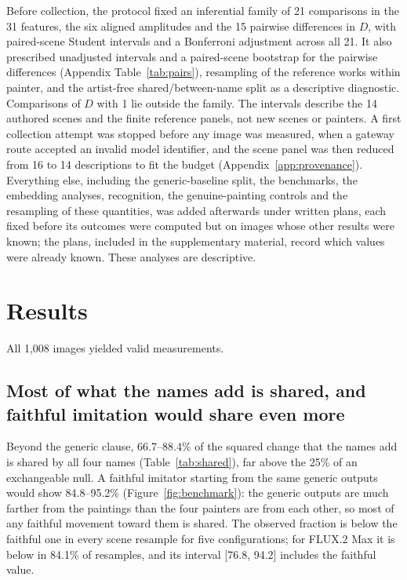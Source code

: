 \documentclass[10pt]{article}
\begin{document}
Before collection, the protocol fixed an inferential family of 21 comparisons in the 31 features,
the six aligned amplitudes and the 15 pairwise differences in $D$, with paired-scene Student
intervals and a Bonferroni adjustment across all 21. It also prescribed unadjusted intervals and a
paired-scene bootstrap for the pairwise differences (Appendix Table~\ref{tab:pairs}), resampling of
the reference works within painter, and the artist-free shared/between-name split as a descriptive
diagnostic. Comparisons of $D$ with 1 lie outside the family. The intervals describe the 14 authored
scenes and the finite reference panels, not new scenes or painters. A first collection attempt was
stopped before any image was measured, when a gateway route accepted an invalid model identifier,
and the scene panel was then reduced from 16 to 14 descriptions to fit the budget
(Appendix~\ref{app:provenance}). Everything else, including the generic-baseline split, the
benchmarks, the embedding analyses, recognition, the genuine-painting controls and the resampling
of these quantities, was added afterwards under written plans, each fixed before its outcomes were
computed but on images whose other results were known; the plans, included in the supplementary
material, record which values were already known. These analyses are descriptive.

\section{Results}\label{sec:results}

All 1,008 images yielded valid measurements.

\subsection{Most of what the names add is shared, and faithful imitation would share even more}\label{sec:shared}



Beyond the generic clause, 66.7--88.4\% of the squared change that the names add is shared by all
four names (Table~\ref{tab:shared}), far above the 25\% of an exchangeable null. A faithful
imitator starting from the same generic outputs would show 84.8--95.2\%
(Figure~\ref{fig:benchmark}): the generic outputs are much farther from the paintings than the four
painters are from each other, so most of any faithful movement toward them is shared. The observed
fraction is below the faithful one in every scene resample for five configurations; for FLUX.2 Max
it is below in 84.1\% of resamples, and its interval [76.8, 94.2] includes the faithful value.
\end{document}

